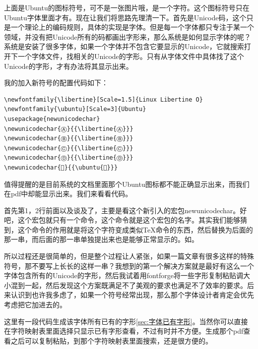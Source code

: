 \documentclass[12pt,oneside]{book}
\begin{document}
\begin{common-format}
上面是Ubuntu的图标符号，可不是一张图片哦，是一个字符。这个图标符号只在Ubuntu字体里面才有。现在让我们将思路先理清一下。首先是Unicode码，这个只是一个理论上的编码规则，具体的实现是字体。但是每一个字体都只专注于某一个领域，并没有把Unicode所有的码都画出字形来，那么系统是如何显示字体的呢？系统是安装了很多字体，如果一个字体并不包含它要显示的Unicode，它就搜索打开下一个字体文件，找相关的Unicode的字形。只有从字体文件中具体找了这个Unicode的字形，才有办法将其显示出来。

我的加入新符号的配置代码如下：
\begin{Verbatim}
\newfontfamily{\libertine}[Scale=1.5]{Linux Libertine O}
\newfontfamily{\ubuntu}[Scale=3]{Ubuntu}
\usepackage{newunicodechar}
\newunicodechar{Ⓐ}{{\libertine{Ⓐ}}}
\newunicodechar{Ⓑ}{{\libertine{Ⓑ}}}
\newunicodechar{Ⓒ}{{\libertine{Ⓒ}}} 
\newunicodechar{Ⓓ}{{\libertine{Ⓓ}}}
\newunicodechar{}{{\ubuntu{}}}
\end{Verbatim}

值得提醒的是目前系统的文档里面那个Ubuntu图标都不能正确显示出来，而我们在pdf中却能显示出来。我们来看看代码。

首先第1，2行前面以及谈及了，主要是看这个新引入的宏包newunicodechar。好吧，这个宏包就只有一个命令，这个命令就是这个宏包的名字。其实我们能够猜到，这个命令的作用就是将这个字符变成类似\TeX 命令的东西，然后替换为后面的那一串，而后面的那一串单独提出来也是能够正常显示的。如{}。

\begin{flushright}
\begin{notecard}[olive!30]{20em}
所以过程还是很简单的，但是整个过程让人紧张，如果一篇文章有很多这样的特殊符号，那不要写上长长的这样一串？我想到的第一个解决方案就是最好有这么一个字体包含所有的Unicode的字形，然后我试着用fontforge将一些字形复制粘贴调大小混到一起，然后发现这个方案既满足不了美观的要求也满足不了效率的要求。后来认识到也许我多虑了，如果一个符号经常出现，那么那个字体设计者肯定会优先考虑把它加进去的。
\end{notecard}
\end{flushright}


这里有一段代码生成该字体所有已有的字形\ref{sec:字体已有字形}。当然你可以直接在字符映射表里面选择只显示已有字形查看，不过有时并不方便。生成那个pdf查看之后可以复制粘贴，到那个字符映射表里面搜索，还是很方便的。



\end{common-format}
\end{document}
